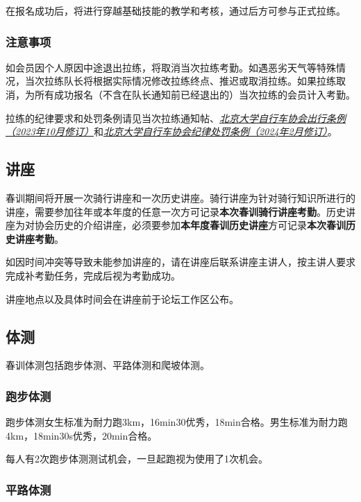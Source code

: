 \documentclass[UTF8]{ctexart}
\begin{document}
在报名成功后，将进行穿越基础技能的教学和考核，通过后方可参与正式拉练。

\subsubsection{注意事项}

如会员因个人原因中途退出拉练，将取消当次拉练考勤。如遇恶劣天气等特殊情况，当次拉练队长将根据实际情况修改拉练终点、推迟或取消拉练。如果拉练取消，为所有成功报名（不含在队长通知前已经退出的）当次拉练的会员计入考勤。


拉练的纪律要求和处罚条例请见当次拉练通知帖、\href{https://chexie.net/bbs/content/?bid=1&tid=9618&p=1}{\textit{北京大学自行车协会出行条例（2023年10月修订）}}和\href{https://chexie.net/bbs/content/?bid=1&tid=9751&p=1}{\textit{北京大学自行车协会纪律处罚条例（2024年2月修订）}}。

\subsection{讲座}


春训期间将开展一次骑行讲座和一次历史讲座。骑行讲座为针对骑行知识所进行的讲座，需要参加往年或本年度的任意一次方可记录\textbf{本次春训骑行讲座考勤}。历史讲座为对协会历史的介绍讲座，必须要参加\textbf{本年度春训历史讲座}方可记录\textbf{本次春训历史讲座考勤}。

如因时间冲突等导致未能参加讲座的，请在讲座后联系讲座主讲人，按主讲人要求完成补考勤任务，完成后视为考勤成功。

讲座地点以及具体时间会在讲座前于论坛工作区公布。

\subsection{体测}

春训体测包括跑步体测、平路体测和爬坡体测。

\subsubsection{跑步体测}

跑步体测女生标准为耐力跑3km，16min30优秀，18min合格。男生标准为耐力跑4km，18min30s优秀，20min合格。

每人有2次跑步体测测试机会，一旦起跑视为使用了1次机会。

\subsubsection{平路体测}
\end{document}
